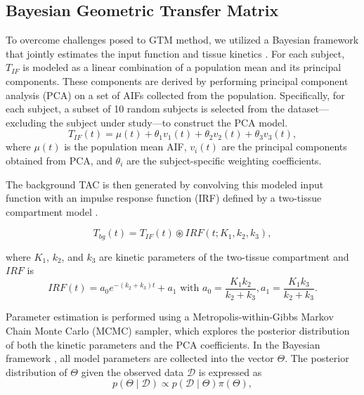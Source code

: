 \subsection{Bayesian Geometric Transfer Matrix}
To overcome challenges posed to GTM method, we utilized a Bayesian framework that jointly estimates the input function and tissue kinetics \cite{irace2021bayesian}.
For each subject, $T_{IF}$ is modeled as a linear combination of a population mean and its principal components.
These components are derived by performing principal component analysis (PCA) on a set of AIFs collected from the population. Specifically, for each subject, a subset of 10 random subjects is selected from the dataset—excluding the subject under study—to construct the PCA model.
\begin{equation}
	T_{IF}(t) = \mu(t) + \theta_{1} v_{1}(t) + \theta_{2} v_{2}(t) + \theta_{3} v_{3}(t),
\end{equation}
where \(\mu(t)\) is the population mean AIF, \(v_{i}(t)\) are the principal components obtained from PCA, and \(\theta_{i}\) are the subject-specific weighting coefficients.

The background TAC is then generated by convolving this modeled input function with an impulse response function (IRF) defined by a two-tissue compartment model \cite{jouvie2013estimation}.

\begin{equation}
	T_{bg}(t) = T_{IF}(t) \circledast IRF(t; K_1, k_2, k_3),
\end{equation}

where $K_1$, $k_2$, and $k_3$ are kinetic parameters of the two-tissue compartment and $IRF$ is
\begin{equation}
	IRF(t) = a_0 e^{-(k_2+k_3)t} + a_1\text{ with } a_0= \frac{K_1 k_2}{k_2+k_3}, a_1= \frac{K_1 k_3}{k_2+k_3}.
\end{equation}

Parameter estimation is performed using a Metropolis-within-Gibbs Markov Chain Monte Carlo (MCMC) sampler, which explores the posterior distribution of both the kinetic parameters and the PCA coefficients.
In the Bayesian framework \cite{irace2021bayesian}, all model parameters are collected into the vector $\Theta$. The posterior distribution of $\Theta$ given the observed data $\mathcal{D}$ is expressed as
\begin{equation}
	p(\Theta \mid \mathcal{D}) \propto p(\mathcal{D} \mid \Theta) \pi(\Theta),
\end{equation}

